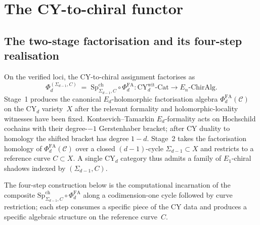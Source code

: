 \documentclass[11pt]{article}
\theoremstyle{plain}
\theoremstyle{definition}
\theoremstyle{remark}
\newcommand{\cC}{\mathcal{C}}
\newcommand{\Eone}{E_1}
\newcommand{\En}{E_n}
\newcommand{\CY}{\mathrm{CY}}
\newcommand{\SpCh}{\mathrm{Sp}^{\mathrm{ch}}}
\begin{document}

\section{The CY-to-chiral functor}
\label{sec:functor}

\subsection{The two-stage factorisation and its four-step
realisation}

On the verified loci, the CY-to-chiral assignment factorises as
\[
 \Phi_d^{(\Sigma_{d-1},C)} \;=\; \SpCh_{\Sigma_{d-1}, C} \circ
 \Phi^{\mathrm{FA}}_d
 \colon \CY_d^{\mathrm{wit}}\text{-}\mathrm{Cat} \longrightarrow
 \En\text{-}\mathrm{ChirAlg}.
\]
Stage~1 produces the canonical $E_d$-holomorphic factorisation
algebra $\Phi^{\mathrm{FA}}_d(\cC)$ on the CY$_d$ variety~$X$ after
the relevant formality and holomorphic-locality witnesses have been
fixed.  Kontsevich--Tamarkin $E_d$-formality acts on Hochschild
cochains with their degree-$-1$ Gerstenhaber bracket; after CY duality
to homology the shifted bracket has degree $1-d$. Stage~2 takes the
factorisation
homology of $\Phi^{\mathrm{FA}}_d(\cC)$ over a closed
$(d-1)$-cycle $\Sigma_{d-1} \subset X$ and restricts to a
reference curve $C \subset X$. A single CY$_d$ category thus
admits a family of $\Eone$-chiral shadows indexed by
$(\Sigma_{d-1}, C)$.

The four-step construction below is the computational incarnation
of the composite $\SpCh_{\Sigma_{d-1}, C} \circ
\Phi^{\mathrm{FA}}_d$ along a codimension-one cycle followed by
curve restriction; each step consumes a specific piece of the CY
data and produces a specific algebraic structure on the reference
curve~$C$.
\end{document}
